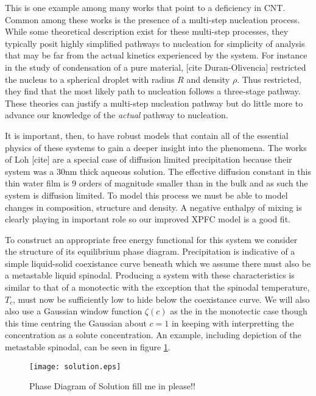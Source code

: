This is one example among many works that point to a deficiency in CNT. Common 
among these works is the presence of a multi-step nucleation process. While
some theoretical description exist for these multi-step processes, they typically
posit highly simplified pathways to nucleation for simplicity of analysis that
may be far from the actual kinetics experienced by the system. For instance in the 
study of condensation of a pure material, [cite Duran-Olivencia] restricted the 
nucleus to a spherical droplet with radius $R$ and density $\rho$. Thus restricted, 
they find that the most likely path to nucleation follows a three-stage pathway. 
These theories can justify a multi-step nucleation pathway but do little more to advance our
knowledge of the \textit{actual} pathway to nucleation.

It is important, then, to have robust models that contain all of the essential
physics of these systems to gain a deeper insight into the phenomena. The works of
Loh [cite] are a special case of diffusion limited precipitation because their system
was a 30nm thick aqueous solution. The effective diffusion constant in this thin
water film is 9 orders of magnitude smaller than in the bulk and as such the system
is diffusion limited. To model this process we must be able to  model
changes in composition, structure and density. A negative enthalpy of mixing is
clearly playing in important role so our improved XPFC model is a good fit.

To construct an appropriate free energy functional for this system we consider the 
structure of its equilibrium phase diagram. Precipitation is indicative of a simple
liquid-solid coexistance curve beneath which we assume there must also be a metastable 
liquid spinodal. Producing a system with these characteristics is similar to that of 
a monotectic with the exception that the spinodal temperature, $T_c$, must now be sufficiently
low to hide below the coexistance curve. We will also also use a Gaussian window function
$\zeta(c)$ as the in the monotectic case though this time centring the Gaussian about
$c = 1$ in keeping with interpretting the concentration as a solute concentration. An
example, including depiction of the metastable spinodal, can be seen in figure 
\ref{fig:precip_phase_dia}.

\begin{figure}
    \centering	
    \texttt{[image: solution.eps]}
    \caption[Coexistance Phase Diagram with Metastable Spinodal]{
        \label{fig:precip_phase_dia} Phase Diagram of Solution \color{ForestGreen} fill
        me in please!!
    }
\end{figure}

